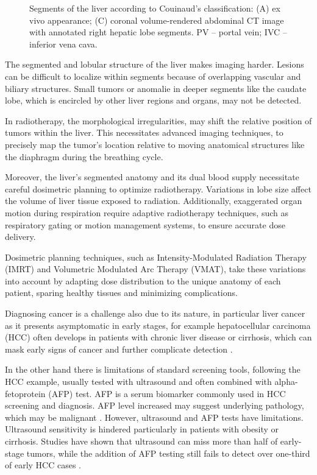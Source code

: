 \begin{figure}[H]
\begin{subfigure}[t]{0.25\textwidth}
		\caption{}
		\label{fig:figure-c}
	\end{subfigure}
	\caption{Segments of the liver according to Couinaud’s classification: (A) ex vivo appearance; (C) coronal volume-rendered abdominal CT image with annotated right hepatic lobe segments. PV – portal vein; IVC – inferior vena cava.}
	\label{fig:liver-segments-side-by-side}
\end{figure}

The segmented and lobular structure of the liver makes imaging harder. Lesions can be difficult to localize within segments because of overlapping vascular and biliary structures. Small tumors or anomalie in deeper segments like the caudate lobe, which is encircled by other liver regions and  organs, may not be detected. \cite{WJGnet2023}%

In radiotherapy, the morphological irregularities, may shift the relative position of tumors within the liver. This necessitates advanced imaging techniques, to precisely map the tumor’s location relative to moving anatomical structures like the diaphragm during the breathing cycle. \cite{luersen2015}

Moreover, the liver’s segmented anatomy and its dual blood supply necessitate careful dosimetric planning to optimize radiotherapy. Variations in lobe size affect the volume of liver tissue exposed to radiation. Additionally, exaggerated organ motion during respiration require adaptive radiotherapy techniques, such as respiratory gating or motion management systems, to ensure accurate dose delivery.\cite{pmc5658876}

Dosimetric planning techniques, such as Intensity-Modulated Radiation Therapy (IMRT) and Volumetric Modulated Arc Therapy (VMAT), take these variations into account by adapting dose distribution to the unique anatomy of each patient, sparing healthy tissues and minimizing complications. \cite{oymak2022}

Diagnosing cancer is a challenge also due to its nature, in particular liver cancer as it presents asymptomatic in early stages, for example hepatocellular carcinoma (HCC) often develops in patients with chronic liver disease or cirrhosis, which can mask early signs of cancer and further complicate detection \cite{quaglia2018,doi:10.1148/radiol.14132362}.

In the other hand there is limitations of standard screening tools, following the HCC example, usually tested with ultrasound and often combined with alpha-fetoprotein (AFP) test. AFP is a serum biomarker commonly used in HCC screening and diagnosis. AFP level increased may suggest underlying pathology, which may be malignant \cite{bialecki2005}.
However, ultrasound and AFP tests have limitations. Ultrasound sensitivity is hindered particularly in patients with obesity or cirrhosis.\cite{floridi2022} Studies have shown that ultrasound can miss more than half of early-stage tumors, while the addition of AFP testing still fails to detect over one-third of early HCC cases \cite{mcmahon2023}.

